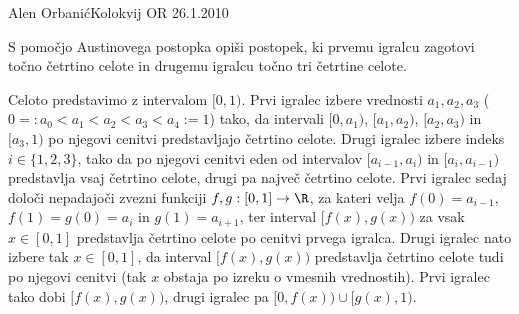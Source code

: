 \begin{naloga}{Alen Orbanić}{Kolokvij OR 26.1.2010}
\begin{vprasanje}
S pomočjo Austinovega postopka opiši postopek,
ki prvemu igralcu zagotovi točno četrtino celote
in drugemu igralcu točno tri četrtine celote.
\end{vprasanje}

\begin{odgovor}
Celoto predstavimo z intervalom $[0, 1)$.
Prvi igralec izbere vrednosti
$a_1, a_2, a_3$ ($0 =: a_0 < a_1 < a_2 < a_3 < a_4 := 1$) tako,
da intervali $[0, a_1)$, $[a_1, a_2)$, $[a_2, a_3)$ in $[a_3, 1)$
po njegovi cenitvi predstavljajo četrtino celote.
Drugi igralec izbere indeks $i \in \{1, 2, 3\}$,
tako da po njegovi cenitvi eden od intervalov
$[a_{i-1}, a_i)$ in $[a_i, a_{i-1})$ predstavlja vsaj četrtino celote,
drugi pa največ četrtino celote.
Prvi igralec sedaj določi nepadajoči zvezni funkciji $f, g: [0, 1] \to \R$,
za kateri velja $f(0) = a_{i-1}$, $f(1) = g(0) = a_i$ in $g(1) = a_{i+1}$,
ter interval $[f(x), g(x))$ za vsak $x \in [0, 1]$ predstavlja četrtino celote
po cenitvi prvega igralca.
Drugi igralec nato izbere tak $x \in [0, 1]$,
da interval $[f(x), g(x))$ predstavlja četrtino celote tudi po njegovi cenitvi
(tak $x$ obstaja po izreku o vmesnih vrednostih).
Prvi igralec tako dobi $[f(x), g(x))$,
drugi igralec pa $[0, f(x)) \cup [g(x), 1)$.
\end{odgovor}
\end{naloga}
